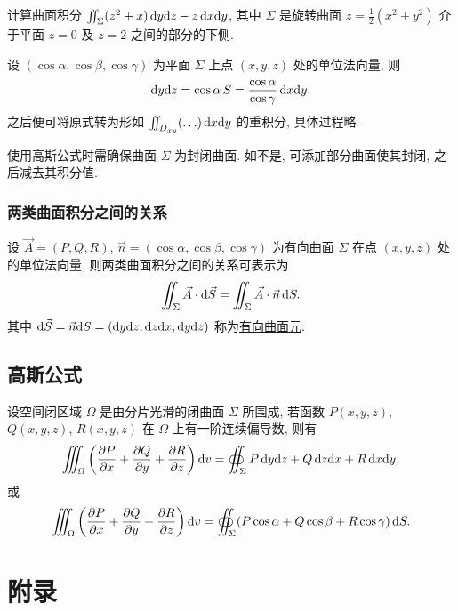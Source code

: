 \documentclass[a4paper,10pt,fleqn]{article}
\newcommand{\pdif}[2]{\frac{\partial #1}{\partial #2}}
\begin{document}
\begin{exmp}
    计算曲面积分 $\iint_\Sigma(z^2+x)\,{\rm d}y{\rm d}z-z\,{\rm d}x{\rm d}y$, 其中 $\Sigma$ 是旋转曲面
    $z=\frac{1}{2}(x^2+y^2)$ 介于平面 $z=0$ 及 $z=2$ 之间的部分的下侧.

    设 $(\cos\alpha,\cos\beta,\cos\gamma)$ 为平面 $\Sigma$ 上点 $(x,y,z)$ 处的单位法向量, 则
    \[
        {\rm d}y{\rm d}z=\cos\alpha\,S=\frac{\cos\alpha}{\cos\gamma}\,{\rm d}x{\rm d}y.
    \]
    之后便可将原式转为形如 $\iint_{D_{xy}}(\ldots)\,{\rm d}x{\rm d}y$ 的重积分, 具体过程略.
\end{exmp}

\begin{attn}
    使用高斯公式时需确保曲面 $\Sigma$ 为封闭曲面. 如不是, 可添加部分曲面使其封闭, 之后减去其积分值.
\end{attn}

\subsubsection*{两类曲面积分之间的关系}

设 $\vec{A}=(P,Q,R)$, $\vec{n}=(\cos\alpha,\cos\beta,\cos\gamma)$ 为有向曲面 $\Sigma$ 在点 $(x,y,z)$ 处的单位法向量,
则两类曲面积分之间的关系可表示为
\[
    \iint_\Sigma\vec{A}\cdot{\rm d}\vec{S}=\iint_\Sigma\vec{A}\cdot\vec{n}\,{\rm d}S.
\]
其中 ${\rm d}\vec{S}=\vec{n}{\rm d}S=({\rm d}y{\rm d}z,{\rm d}z{\rm d}x,{\rm d}y{\rm d}z)$ 称为\uline{有向曲面元}.

\subsection{高斯公式}

\begin{thm}
    设空间闭区域 $\Omega$ 是由分片光滑的闭曲面 $\Sigma$ 所围成, 若函数 $P(x,y,z)$, $Q(x,y,z)$, $R(x,y,z)$ 在 $\Omega$
    上有一阶连续偏导数, 则有
    \[
        \iiint_\Omega\left(\pdif{P}{x}+\pdif{Q}{y}+\pdif{R}{z}\right){\rm d}v=\oiint_\Sigma P\,{\rm d}y{\rm d}z+Q\,{\rm d}z{\rm d}x+R\,{\rm d}x{\rm d}y,
    \]
    或
    \[
        \iiint_\Omega\left(\pdif{P}{x}+\pdif{Q}{y}+\pdif{R}{z}\right){\rm d}v=\oiint_\Sigma(P\cos\alpha+Q\cos\beta+R\cos\gamma)\,{\rm d}S.
    \]
\end{thm}

\pagebreak

\section*{附录}
\end{document}
